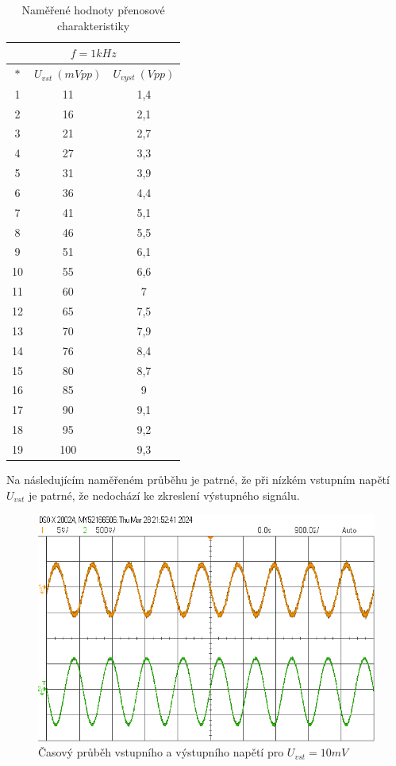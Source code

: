 \documentclass[a4paper, czech]{article}
\begin{document}
\begin{table}[H]
    \centering
    \begin{tabular}{ccc}
        \multicolumn{3}{c}{$f = 1kHz$} \\
        \toprule
        $*$  & $U_{vst}\ (mVpp)$ & $U_{vyst}\ (Vpp)$ \\
        \midrule
        1  & 11        & 1,4       \\
        2  & 16        & 2,1       \\
        3  & 21        & 2,7       \\
        4  & 27        & 3,3       \\
        5  & 31        & 3,9       \\
        6  & 36        & 4,4       \\
        7  & 41        & 5,1       \\
        8  & 46        & 5,5       \\
        9  & 51        & 6,1       \\
        10 & 55        & 6,6       \\
        11 & 60        & 7         \\
        12 & 65        & 7,5       \\
        13 & 70        & 7,9       \\
        14 & 76        & 8,4       \\
        15 & 80        & 8,7       \\
        16 & 85        & 9         \\
        17 & 90        & 9,1       \\
        18 & 95        & 9,2       \\
        19 & 100       & 9,3       \\
        \bottomrule
    \end{tabular}
    \caption{Naměřené hodnoty přenosové charakteristiky}
\end{table}

Na následujícím naměřeném průběhu je patrné, že při nízkém vstupním napětí $U_{vst}$ je patrné, že nedochází ke zkreslení výstupného signálu.

\begin{figure}[H]
    \centering
    \includegraphics{prubeh_10mVpp.png}
    \caption{Časový průběh vstupního a výstupního napětí pro $U_{vst} =  10 mV$}
\end{figure}
\end{document}

